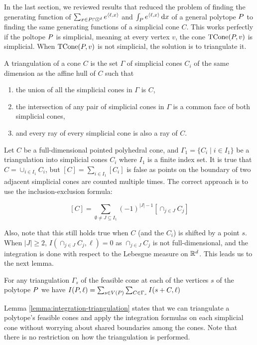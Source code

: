 In the last section, we reviewed results that reduced the problem of finding the generating function of $\sum_{x \in { P} \cap {\mathbb Z}^d } e^{{\langle} \ell, x {\rangle} }$ and $\int_{ P} e^{{\langle} \ell, x {\rangle}} \,\mathrm{d} x$ of a general polytope ${ P}$ to finding the same generating functions of a simplicial cone $C$. This works perfectly if the poltope ${ P}$ is simplicial, meaning at every vertex $v$, the cone $\operatorname{TCone}({ P}, v)$ is simplicial. When $\operatorname{TCone}({ P}, v)$ is not simplicial, the solution is to triangulate it.

\begin{definition}
A triangulation of a cone $C$ is the set $\Gamma$ of simplicial cones $C_i$ of the same dimension as the affine hull of $C$ such that
\begin{enumerate}
\item the union of all the simplicial cones in $\Gamma$ is $C$,
\item the intersection of any pair of simplicial cones in $\Gamma$ is a common face of both simplicial cones,
\item and every ray of every simplicial cone is also a ray of $C$.
\end{enumerate}
\end{definition}
  
 Let $C$ be a full-dimensional pointed polyhedral cone, and $\Gamma_1 = \{ C_i \mid i \in I_1\}$ be a triangulation into simplicial cones $C_i$ where $I_1$ is a finite index set. It is true that $C = \cup_{i \in I_1} C_i$, but $[C] = \sum_{i \in I_1} [C_i]$ is false as points on the boundary of two adjacent simplicial cones are counted multiple times. The correct approach is to use the inclusion-exclusion formula:
 
 \[ [C] = \sum_{\emptyset \neq J \subseteq I_1} (-1)^{|J|-1} [\cap_{j \in J} C_j]\]

Also, note that this still holds true when $C$ (and the $C_i$) is shifted by a point $s$. When $|J| \geq 2$, $I(\cap_{j \in J} C_j, \ell) = 0$ as $\cap_{j \in J} C_j$ is not full-dimensional, and the integration is done with respect to the Lebesgue measure on ${\mathbb R}^d$. This leads us to the next lemma.

\begin{lemma}
\label{lemma:integration-triangulation}
For any triangulation $\Gamma_s$ of the feasible cone at each of the vertices $s$ of the polytope ${ P}$ we have $I({ P},\ell) = \sum_{s \in V({ P})} \sum_{C \in \Gamma_s} I(s+C,\ell)$
\end{lemma}

Lemma \ref{lemma:integration-triangulation} states that we can triangulate a polytope's feasible cones and apply the integration formulas on each simplicial cone without worrying about shared boundaries among the cones. Note that there is no restriction on how the triangulation is performed. 

